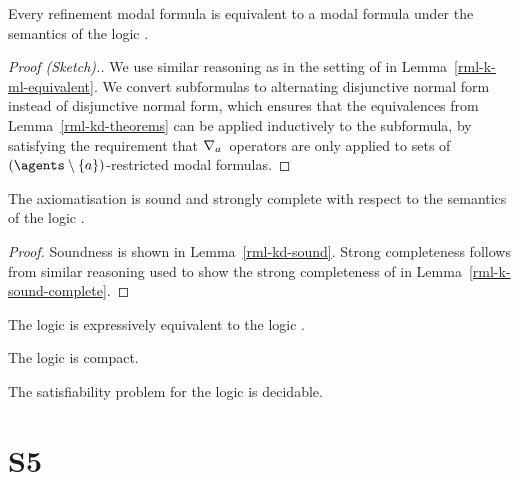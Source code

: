 \begin{lemma}
Every refinement modal formula is equivalent to a modal formula under the semantics of the logic \logicRmlKD{}.
\end{lemma}

\begin{proof}[Proof (Sketch).]
We use similar reasoning as in the setting of \logicRmlK{} in Lemma~\ref{rml-k-ml-equivalent}.
We convert subformulas to alternating disjunctive normal form instead of disjunctive normal form, which ensures that the equivalences from Lemma~\ref{rml-kd-theorems} can be applied inductively to the subformula, by satisfying the requirement that $\nabla_{a}$~operators  are only applied to sets of $(\agents \setminus \{\agentA\})$-restricted modal formulas.
\end{proof}

\begin{theorem}
The axiomatisation \axiomRmlKD{} is sound and strongly complete with respect to the semantics of the logic \logicRmlKD{}.
\end{theorem}

\begin{proof}
Soundness is shown in Lemma~\ref{rml-kd-sound}.
Strong completeness follows from similar reasoning used to show the strong completeness of \axiomRmlK{} in Lemma~\ref{rml-k-sound-complete}.
\end{proof}

\begin{corollary}
The logic \logicRmlKD{} is expressively equivalent to the logic \logicKD{}.
\end{corollary}

\begin{corollary}
The logic \logicRmlKD{} is compact.
\end{corollary}

\begin{corollary}
The satisfiability problem for the logic \logicRmlKD{} is decidable.
\end{corollary}

\section{S5}

